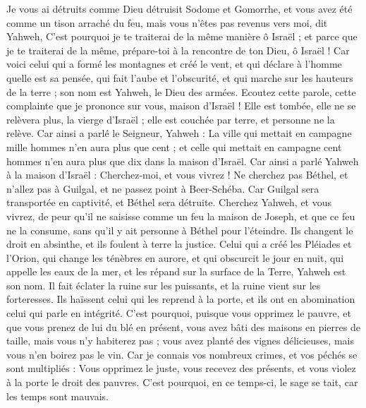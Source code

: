 \begin{multicols}{2}
Je vous ai détruits comme Dieu détruisit Sodome et Gomorrhe, et vous avez été comme un tison arraché du feu, mais vous n’êtes pas revenus vers moi, dit Yahweh,
C'est pourquoi je te traiterai de la même manière ô Israël ; et parce que je te traiterai de la même, prépare-toi à la rencontre de ton Dieu, ô Israël !
Car voici celui qui a formé les montagnes et créé le vent, et qui déclare à l'homme quelle est sa pensée, qui fait l'aube et l'obscurité, et qui marche sur les hauteurs de la terre ; son nom est Yahweh, le Dieu des armées.
\VerseOne{}Ecoutez cette parole, cette complainte que je prononce sur vous, maison d'Israël !
Elle est tombée, elle ne se relèvera plus, la vierge d'Israël ; elle est couchée par terre, et personne ne la relève.
Car ainsi a parlé le Seigneur, Yahweh : La ville qui mettait en campagne mille hommes n'en aura plus que cent ; et celle qui mettait en campagne cent hommes n'en aura plus que dix dans la maison d’Israël.
Car ainsi a parlé Yahweh à la maison d'Israël : Cherchez-moi, et vous vivrez !
Ne cherchez pas Béthel, et n'allez pas à Guilgal, et ne passez point à Beer-Schéba. Car Guilgal sera transportée en captivité, et Béthel sera détruite.
Cherchez Yahweh, et vous vivrez, de peur qu'il ne saisisse comme un feu la maison de Joseph, et que ce feu ne la consume, sans qu'il y ait personne à Béthel pour l’éteindre.
Ils changent le droit en absinthe, et ils foulent à terre la justice.
Celui qui a créé les Pléiades et l'Orion, qui change les ténèbres en aurore, et qui obscurcit le jour en nuit, qui appelle les eaux de la mer, et les répand sur la surface de la Terre, Yahweh est son nom.
Il fait éclater la ruine sur les puissants, et la ruine vient sur les forteresses.
Ils haïssent celui qui les reprend à la porte, et ils ont en abomination celui qui parle en intégrité.
C'est pourquoi, puisque vous opprimez le pauvre, et que vous prenez de lui du blé en présent, vous avez bâti des maisons en pierres de taille, mais vous n'y habiterez pas ; vous avez planté des vignes délicieuses, mais vous n'en boirez pas le vin.
Car je connais vos nombreux crimes, et vos péchés se sont multipliés : Vous opprimez le juste, vous recevez des présents, et vous violez à la porte le droit des pauvres.
C'est pourquoi, en ce temps-ci, le sage se tait, car les temps sont mauvais.

\end{multicols}
